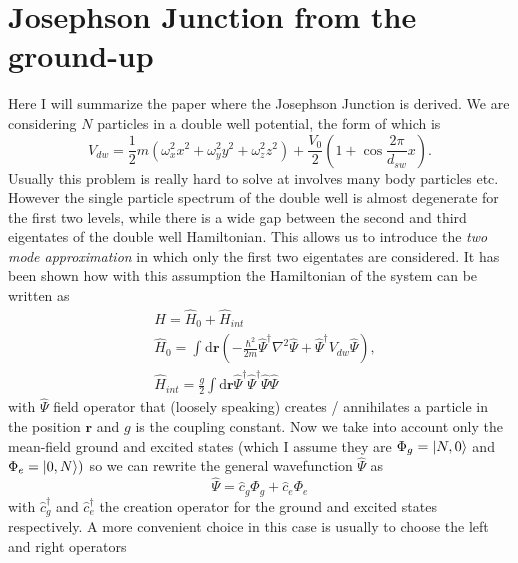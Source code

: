 \section{Josephson Junction from the ground-up}
Here I will summarize the paper \cite{ABosonicJosepGati2007} where the Josephson Junction is derived.
We are considering  $ N $  particles in a double well potential, the form of which is
\begin{equation}
	\label{eq:HamiltonianDoubleWell}
	V_{dw} = \frac{1}{2} m \left(\omega^2_{x} x^2 + \omega^2_{y} y^2 + \omega^2_{z} z^2\right) + \frac{V_{0}}{2} \left(1 + \cos\frac{2\pi}{d_{sw}} x\right).
\end{equation}
Usually this problem is really hard to solve at involves many body particles etc. However the single particle spectrum of the double well is almost degenerate for the first two levels, while there is a wide gap between the second and third eigentates of the double well Hamiltonian.
This allows us to introduce the \textit{two mode approximation} in which only the first two eigentates are considered.
It has been shown how with this assumption the Hamiltonian of the system can be written as
\begin{align}
	\label{eq:HamiltonianDoubleWellIntegral}
	 & H = \hat{ H }_{0} + \hat{ H }_{int}                                                                                                                          \\
	 & \hat{H}_{0} = \int_{}^{}  \mathrm{d\mathbf{r}}\left(-\frac{\hbar^2}{2m} \hat{\Psi}^{\dag}\nabla^2\hat{ \Psi } + \hat{\Psi}^{\dag}V_{dw}\hat{ \Psi }\right)	, \\
	 & \hat{H}_{int} = \frac{g}{2}\int \mathrm{d\mathbf{r}} \hat{\Psi}^{\dag}\hat{\Psi}^{\dag}\hat{ \Psi }\hat{ \Psi }
\end{align}
with $ \hat{\Psi} $ field operator that (loosely speaking) creates / annihilates a particle in the position $ \mathbf{r} $ and $ g $ is the coupling constant.
Now we take into account only the mean-field ground and excited states (which I assume they are $\Phi_g = \ket{N,0}$ and  $\Phi_e = \ket{0,N})$ so we can rewrite the general wavefunction $\hat{ \Psi }$ as
\begin{equation}
	\label{eq:GeneralState}
	\hat{\Psi} = \hat{c}_{g}\Phi_g + \hat{c}_{e}\Phi_e
\end{equation}
with $\hat{c}_g^{\dagger} $ and $\hat{c}_e^{\dagger} $ the creation operator for the ground and excited states respectively.
A more convenient choice in this case is usually to choose the left and right operators
